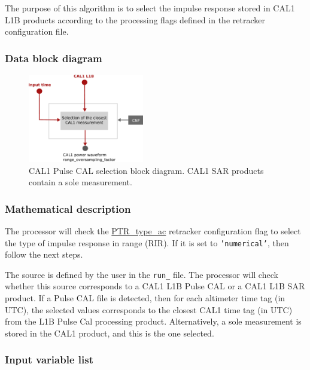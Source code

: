 \documentclass[11pt,a4paper]{article}
\begin{document}
The purpose of this algorithm is to select the impulse response stored in CAL1 L1B products according to the processing flags defined in the retracker configuration file.

\subsubsection{Data block diagram}


\begin{figure}[htb!]\centering
  \centering
  \includegraphics[width=0.45\textwidth]{fig/cal1_data_selection}
  \caption[CAL1 Pulse CAL selection block diagram]{CAL1 Pulse CAL selection block diagram. CAL1 SAR products contain a sole measurement.}
  \label{fig:cal1_selection_diagram}
\end{figure}


\subsubsection{Mathematical description}

The processor will check the \url{PTR_type_ac} retracker configuration flag to select the type of impulse response in range (RIR). If it is set to \texttt{'numerical'}, then follow the next steps.

The source is defined by the user in the \texttt{run\_} file. The processor will check whether this source corresponds to a CAL1 L1B Pulse CAL or a CAL1 L1B SAR product. If a Pulse CAL file is detected, then for each altimeter time tag (in UTC), the selected values corresponds to the closest CAL1 time tag (in UTC) from the L1B Pulse Cal processing product. Alternatively, a sole measurement is stored in the CAL1 product, and this is the one selected.


\subsubsection{Input variable list}\label{sec:input_var_aux_data_selection}
\end{document}
